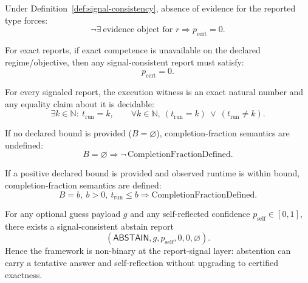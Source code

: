 \begin{proposition}\label{prop:no-evidence-zero-certified}
Under Definition~\ref{def:signal-consistency}, absence of evidence for the reported type forces:
\[
\neg\exists\ \text{evidence object for }r
\Rightarrow
p_{\mathrm{cert}}=0.
\]
\end{proposition}

\begin{corollary}\label{cor:exact-no-competence-zero-certified}
For exact reports, if exact competence is unavailable on the declared regime/objective, then any signal-consistent report must satisfy:
\[
p_{\mathrm{cert}} = 0.
\]
\end{corollary}

\begin{proposition}\label{prop:steps-run-scalar}
For every signaled report, the execution witness is an exact natural number and any equality claim about it is decidable:
\[
\exists k\in\mathbb{N}:\ t_{\mathrm{run}}=k,
\qquad
\forall k\in\mathbb{N},\ (t_{\mathrm{run}}=k)\ \vee\ (t_{\mathrm{run}}\neq k).
\]
\end{proposition}

\begin{proposition}\label{prop:no-fraction-without-bound}
If no declared bound is provided ($B=\varnothing$), completion-fraction semantics are undefined:
\[
B=\varnothing \Rightarrow \neg\,\mathrm{CompletionFractionDefined}.
\]
\end{proposition}

\begin{proposition}\label{prop:fraction-defined-under-bound}
If a positive declared bound is provided and observed runtime is within bound, completion-fraction semantics are defined:
\[
B=b,\ b>0,\ t_{\mathrm{run}}\le b
\Rightarrow
\mathrm{CompletionFractionDefined}.
\]
\end{proposition}

\begin{proposition}\label{prop:abstain-guess-self-signal}
For any optional guess payload $g$ and any self-reflected confidence $p_{\mathrm{self}}\in[0,1]$, there exists a signal-consistent abstain report
\[
(\mathsf{ABSTAIN}, g, p_{\mathrm{self}}, 0, 0, \varnothing).
\]
Hence the framework is non-binary at the report-signal layer: abstention can carry a tentative answer and self-reflection without upgrading to certified exactness.
\end{proposition}

